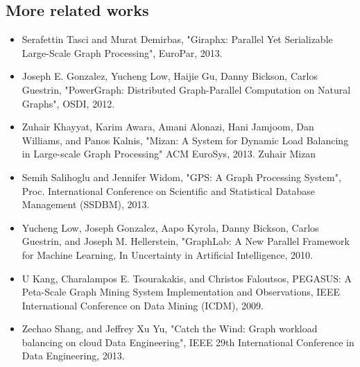 \subsection{More related works}
\begin{frame}
\begin{itemize}

\item Serafettin Tasci and Murat Demirbas, "Giraphx: Parallel Yet Serializable Large-Scale Graph Processing", EuroPar, 2013. 
\item Joseph E. Gonzalez, Yucheng Low, Haijie Gu, Danny Bickson, Carlos Guestrin, "PowerGraph: Distributed Graph-Parallel Computation on Natural Graphs", OSDI, 2012.     
\item Zuhair Khayyat, Karim Awara, Amani Alonazi, Hani Jamjoom, Dan Williams, and Panos Kalnis, "Mizan: A System for Dynamic Load Balancing in Large-scale Graph Processing" ACM EuroSys, 2013. 
Zuhair Mizan 
\item Semih Salihoglu and Jennifer Widom, "GPS: A Graph Processing System", Proc. International Conference on Scientific and Statistical Database Management (SSDBM), 2013.
    \end{itemize}
\end{frame}
 
\begin{frame}
\begin{itemize}
 \item Yucheng Low, Joseph Gonzalez, Aapo Kyrola, Danny Bickson, Carlos Guestrin, and Joseph M. Hellerstein, "GraphLab: A New Parallel Framework for Machine Learning, In Uncertainty in Artificial Intelligence, 2010.
\item U Kang, Charalampos E. Tsourakakis, and Christos Faloutsos, PEGASUS: A Peta-Scale Graph Mining System Implementation and Observations, IEEE International Conference on Data Mining (ICDM), 2009.
\item Zechao Shang, and Jeffrey Xu Yu, "Catch the Wind: Graph workload balancing on cloud Data Engineering", IEEE 29th International Conference in Data Engineering, 2013.
    \end{itemize}
\end{frame}